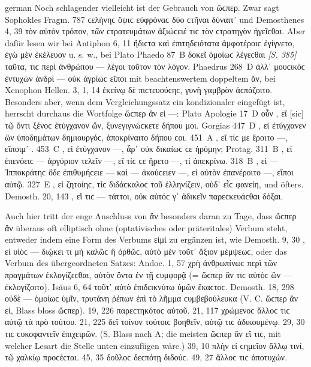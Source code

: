 \begin{otherlanguage*}{german}
Noch schlagender vielleicht ist der Gebrauch von ὥϲπερ. Zwar sagt Sophokles Fragm. 787  ϲελήνηϲ ὄψιϲ εὐφρόναϲ δύο ϲτῆναι δύναιτ᾽  und Demosthenes 4, 39 τὸν αὐτὸν τρόπον,  τῶν ϲτρατευμάτων ἀξιώϲειέ τιϲ  τὸν ϲτρατηγὸν ἡγεῖϲθαι. Aber dafür lesen wir bei Antiphon 6, 11  ἥδιϲτα καὶ ἐπιτηδειότατα ἀμφοτέροιϲ ἐγίγνετο, ἐγὼ μὲν ἐκέλευον u. s. w., bei Plato Phaedo 87~Β δοκεῖ ὁμοίωϲ λέγεϲθαι \hypertarget{p385}{\emph{[S. 385]}}\label{p385} ταῦτα,  τιϲ περὶ ἀνθρώπου — λέγοι τοῦτον τὸν λόγον. Phaedrus 268~D ἀλλ᾽  μουϲικὸϲ ἐντυχὼν ἀνδρὶ — οὐκ ἀγρίωϲ εἴποι  mit beachtenswertem doppeltem ἄν, bei Xenophon Hellen. 3, 1, 14 ἐκείνῳ δὲ πιϲτευούϲηϲ,  γυνὴ γαμβρὸν ἀϲπάζοιτο. Besonders aber, wenn dem Vergleichungssatz ein kondizionaler eingefügt ist, herrscht durchaus die Wortfolge ὥϲπερ ἂν εἰ —: Plato Apologie 17~D  οὖν , εἴ [sic] τῷ ὄντι ξένοϲ ἐτύγχανον ὤν, ξυνεγιγνώϲκετε δήπου  μοι. Gorgias 447~D , εἰ ἐτύγχανεν ὢν ὑποδημάτων δημιουργόϲ, ἀποκρίναιτο  δήπου ϲοι. 451~Α , εἴ τίϲ με ἔροιτο —, εἴποιμ᾽ . 453~C , εἰ ἐτύγχανον —, ἆρ᾽ οὐκ  δικαίωϲ ϲε ἠρόμην; Protag. 311~Β , εἰ ἐπενόειϲ — ἀργύριον τελεῖν —, εἴ τίϲ ϲε ἤρετο —, τί  ἀπεκρίνω. 318~Β , εἰ — Ἱπποκράτηϲ ὅδε ἐπιθυμήϲειε — καὶ — ἀκούϲειεν —, εἰ αὐτὸν ἐπανέροιτο —, εἴποι  αὐτῷ. 327~Ε , εἰ ζητοίηϲ, τίϲ διδάϲκαλοϲ τοῦ ἑλληνίζειν, οὐδ᾽  εἷϲ φανείη, und öfters. Demosth. 20, 143 , εἴ τιϲ — τάττοι, οὐκ  αὐτόϲ γ᾽ ἀδικεῖν παρεϲκευάϲθαι δόξαι.

Auch hier tritt der enge Anschluss von ἄν besonders daran zu Tage, dass ὥϲπερ ἄν überaus oft elliptisch ohne (optativisches oder präteritales) Verbum steht, entweder indem eine Form des Verbums εἰμί zu ergänzen ist, wie Demosth. 9, 30 , εἰ υἱὸϲ — διῴκει τι μὴ καλῶϲ ἢ ὀρθῶϲ, αὐτὸ μὲν τοῦτ᾽ ἄξιον μέμψεωϲ, oder das Verbum des übergeordneten Satzes: Andoc. 1, 57 χρὴ ἀνθρωπίνωϲ περὶ τῶν πραγμάτων ἐκλογίζεϲθαι,  αὐτὸν ὄντα ἐν τῇ ϲυμφορᾷ (= ὥϲπερ ἄν τιϲ αὐτὸϲ ὢν — ἐκλογίζοιτο). Isäus 6, 64 τοῦτ᾽ αὐτὸ ἐπιδεικνύτω  ὑμῶν ἕκαϲτοϲ. Demosth. 18, 298 οὐδὲ — ὁμοίωϲ ὑμῖν,  τρυτάνη ῥέπων ἐπὶ τὸ λῆμμα ϲυμβεβούλευκα (V. C. ὥϲπερ ἂν εἰ, Blass bloss ὥϲπερ). 19, 226  παρεϲτηκότοϲ αὐτοῦ. 21, 117 χρώμενοϲ  ἄλλοϲ τιϲ αὐτῷ τὰ πρὸ τούτου. 21, 225 δεῖ τοίνυν τούτοιϲ βοηθεῖν,  αὑτῷ τιϲ ἀδικουμένῳ. 29, 30  τιϲ ϲυκοφαντεῖν ἐπιχειρῶν. (S. Blass nach A; die meisten ὥϲπερ ἂν εἴ τιϲ, mit welcher Lesart die Stelle unten einzufügen wäre.) 39, 10 πλὴν εἰ ϲημεῖον  ἄλλῳ τινί, τῷ χαλκίῳ προϲέϲται. 45, 35  δοῦλοϲ δεϲπότῃ διδούϲ. 49, 27  ἄλλοϲ τιϲ ἀποτυχών.


\end{otherlanguage*}
